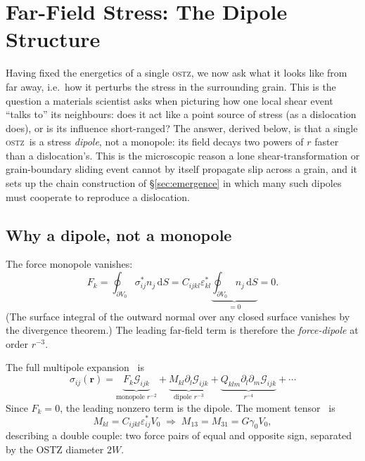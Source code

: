 \documentclass[3p]{elsarticle}
\newcommand{\OSTZ}{\textsc{ostz}}
\newcommand{\gz}{\gamma_0}
\begin{document}
\section{Far-Field Stress: The Dipole Structure}
\label{sec:dipole}

Having fixed the energetics of a single \OSTZ, we now ask what it
looks like from far away, i.e.\ how it perturbs the stress in the
surrounding grain. This is the question a materials scientist asks
when picturing how one local shear event ``talks to'' its neighbours:
does it act like a point source of stress (as a dislocation does),
or is its influence short-ranged? The answer, derived below, is that
a single \OSTZ\ is a stress \emph{dipole}, not a monopole: its field
decays two powers of $r$ faster than a dislocation's. This is the
microscopic reason a lone shear-transformation or grain-boundary
sliding event cannot by itself propagate slip across a grain, and it
sets up the chain construction of \S\ref{sec:emergence} in which many
such dipoles must cooperate to reproduce a dislocation.

\subsection{Why a dipole, not a monopole}

The force monopole vanishes:
\begin{equation}
  F_k=\oint_{\partial V_0}\sigma_{ij}^* n_j\,\mathrm dS
  =C_{ijkl}\varepsilon^*_{kl}
  \underbrace{\oint_{\partial V_0}n_j\,\mathrm dS}_{=0}=0.
  \label{eq:monopole}
\end{equation}
(The surface integral of the outward normal over any closed surface
vanishes by the divergence theorem.) The leading far-field term is
therefore the \emph{force-dipole} at order $r^{-3}$.

The full multipole expansion~\citep{mura1987} is
\begin{equation}
  \sigma_{ij}(\mathbf r)=
  \underbrace{F_k\mathcal G_{ijk}}_{\text{monopole }r^{-2}}
  +\underbrace{M_{kl}\partial_l\mathcal G_{ijk}}_{\text{dipole }r^{-3}}
  +\underbrace{Q_{klm}\partial_l\partial_m\mathcal G_{ijk}}_{r^{-4}}
  +\cdots
  \label{eq:multipole}
\end{equation}
Since $F_k=0$, the leading nonzero term is the dipole. The moment
tensor~\citep{mura1987} is
\begin{equation}
  M_{kl}=C_{ijkl}\varepsilon^*_{ij}V_0\;\Rightarrow\;
  M_{13}=M_{31}=G\gz V_0,
  \label{eq:moment}
\end{equation}
describing a double couple: two force pairs of equal and opposite sign,
separated by the OSTZ diameter $2W$.
\end{document}
